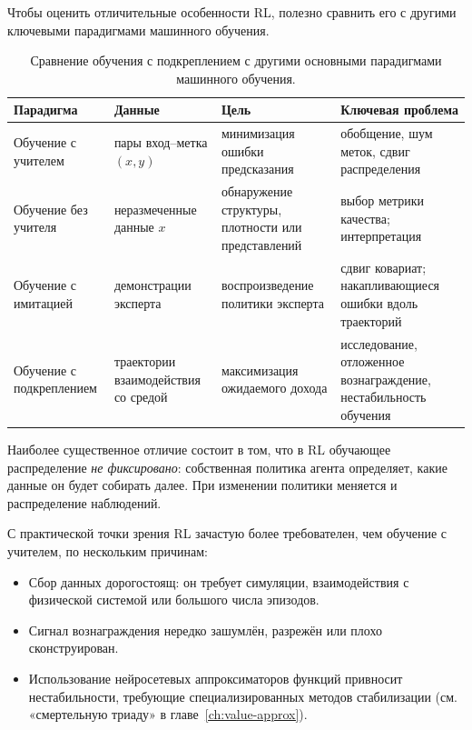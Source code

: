 Чтобы оценить отличительные особенности RL, полезно сравнить его с другими ключевыми парадигмами машинного обучения.

\begin{table}[ht]
\centering
\renewcommand{\arraystretch}{1.3}
\begin{tabular}{@{}p{2.6cm}p{2.9cm}p{3.2cm}p{3.6cm}@{}}
\toprule
\textbf{Парадигма} & \textbf{Данные} & \textbf{Цель} & \textbf{Ключевая проблема} \\
\midrule
Обучение с учителем &
пары вход--метка $(x,y)$ &
минимизация ошибки предсказания &
обобщение, шум меток, сдвиг распределения \\
\addlinespace
Обучение без учителя &
неразмеченные данные $x$ &
обнаружение структуры, плотности или представлений &
выбор метрики качества; интерпретация \\
\addlinespace
Обучение с имитацией &
демонстрации эксперта &
воспроизведение политики эксперта &
сдвиг ковариат; накапливающиеся ошибки вдоль траекторий \\
\addlinespace
Обучение с подкреплением &
траектории взаимодействия со средой &
максимизация ожидаемого дохода &
исследование, отложенное вознаграждение, нестабильность обучения \\
\bottomrule
\end{tabular}
\caption{Сравнение обучения с подкреплением с другими основными парадигмами машинного обучения.}
\label{tab:rl-vs-ml}
\end{table}

Наиболее существенное отличие состоит в том, что в RL обучающее распределение \emph{не фиксировано}: собственная политика агента определяет, какие данные он будет собирать далее.  При изменении политики меняется и распределение наблюдений.

С практической точки зрения RL зачастую более требователен, чем обучение с учителем, по нескольким причинам:
\begin{itemize}[leftmargin=*]
\item Сбор данных дорогостоящ: он требует симуляции, взаимодействия с физической системой или большого числа эпизодов.
\item Сигнал вознаграждения нередко зашумлён, разрежён или плохо сконструирован.
\item Использование нейросетевых аппроксиматоров функций привносит нестабильности, требующие специализированных методов стабилизации (см. «смертельную триаду» в главе~\ref{ch:value-approx}).
\end{itemize}


